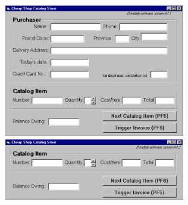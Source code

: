 \documentclass[pdf]{beamer}
\begin{document}
{%
\begin{frame}
\begin{figure}
\vspace*{-32mm}
    \includegraphics[width=0.7\textwidth]{28_Screen1.png} \par
    \vspace{3mm}
   \includegraphics[width=0.7\textwidth]{28_Screen2.png}  
\end{figure}
\frametitle{\textcolor{myBlue}{\textbf{\hspace{5mm}{Cheap Shop}}}} \par
\vspace{10mm}
\textcolor{myBlue}{\footnotesize{{\hspace{15mm}{Screen 1}}}}\par
\vspace{40mm}
\textcolor{myBlue}{\footnotesize{{\hspace{15mm}{Screen 2}}}}
\end{frame}}
\end{document}
